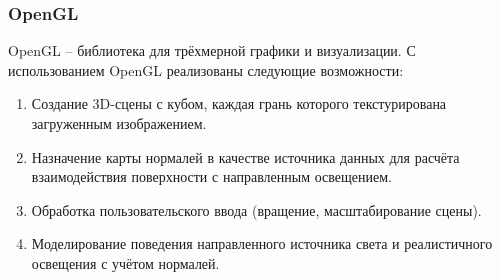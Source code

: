 \subsubsection{OpenGL}
OpenGL -- библиотека для трёхмерной графики и визуализации.
С использованием OpenGL реализованы следующие возможности:
\begin{enumerate}
	\item Создание 3D-сцены с кубом, каждая грань которого текстурирована загруженным изображением.
	\item Назначение карты нормалей в качестве источника данных для расчёта взаимодействия поверхности с направленным освещением.
	\item Обработка пользовательского ввода (вращение, масштабирование сцены).
	\item Моделирование поведения направленного источника света и реалистичного освещения с учётом нормалей.
\end{enumerate}
